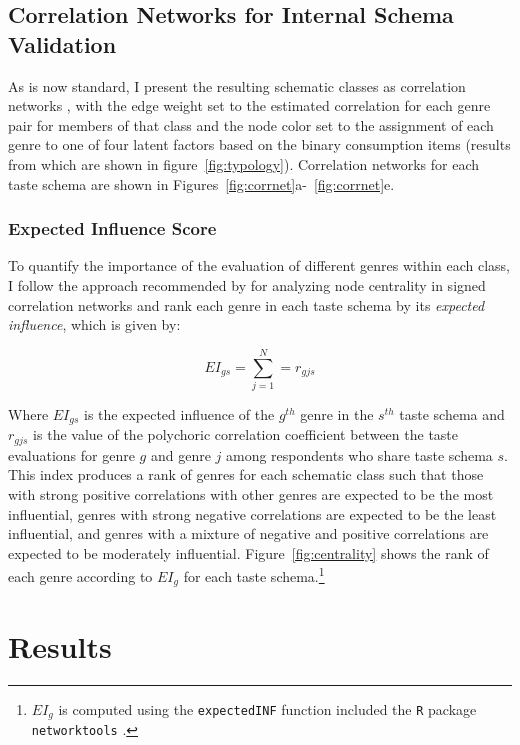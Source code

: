 \documentclass[preprint, authoryear,11pt, 3p]{elsarticle}
\begin{document}
\subsection{Correlation Networks for Internal Schema Validation} 
As is now standard, I present the resulting schematic classes as correlation networks \citep{ boutyline2017improving, goldberg2011mapping, epskamp2012qgraph}, with the edge weight set to the estimated correlation for each genre pair for members of that class and the node color set to the assignment of each genre to one of four latent factors based on the binary consumption items (results from which are shown in figure~\ref{fig:typology}). Correlation networks for each taste schema are shown in Figures~\ref{fig:corrnet}a-~\ref{fig:corrnet}e. 

\subsubsection{Expected Influence Score}
To quantify the importance of the evaluation of different genres within each class, I follow the approach recommended by \citet{robinaugh2016identifying} for analyzing node centrality in signed correlation networks and rank each genre in each taste schema by its \emph{expected influence}, which is given by:

\begin{equation}
EI_{gs} = \sum_{j=1}^{N} = r_{gjs}    
\end{equation}

Where $EI_{gs}$ is the expected influence of the $g^{th}$ genre in the $s^{th}$ taste schema and $r_{gjs}$ is the value of the polychoric correlation coefficient between the taste evaluations for genre $g$ and genre $j$ among respondents who share taste schema $s$. This index produces a rank of genres for each schematic class such that those with strong positive correlations with other genres are expected to be the most influential, genres with strong negative correlations are expected to be the least influential, and genres with a mixture of negative and positive correlations are expected to be moderately influential. Figure~\ref{fig:centrality} shows the rank of each genre according to $EI_g$ for each taste schema.\footnote{$EI_g$ is computed using the \texttt{expectedINF} function included the \texttt{R} package \texttt{networktools} \citep{networktools}.}

\section{Results}
\end{document}
